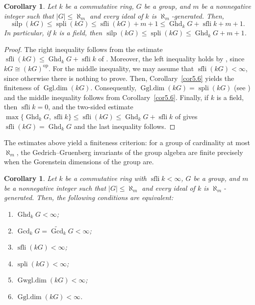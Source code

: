 \documentclass[12pt]{amsart}
\newtheorem{corollary}[theorem]{Corollary}
\theoremstyle{remark}
\theoremstyle{definition}
\theoremstyle{plain}
\DeclareMathOperator{\Ghd}{Ghd}
\DeclareMathOperator{\Gcd}{Gcd}
\DeclareMathOperator{\sfli}{sfli}
\DeclareMathOperator{\spli}{spli}
\DeclareMathOperator{\silp}{silp}
\DeclareMathOperator{\Gwgl}{Gwgl.dim}
\DeclareMathOperator{\Ggl}{Ggl.dim}
\newcommand{\PGFcd}{\widetilde{\Gcd}}
\newcommand{\alephm}{\aleph_m}
\begin{document}
\begin{corollary}\label{cor5.7}
Let $k$ be a commutative ring, $G$ be a group, and $m$ be a nonnegative integer such that $|G|\le\alephm$ and every ideal of $k$ is $\alephm$-generated. Then, \[\silp(kG)\le \spli(kG)\le\sfli(kG)+m+1\le\Ghd_kG+\sfli k+m+1 .\]
In particular, if $k$ is a field, then $\silp(kG)\le\spli(kG)\le\Ghd_kG+m+1$.
\end{corollary}

\begin{proof}
The right inequality follows from the estimate $\sfli(kG)\le\Ghd_kG+\sfli k$ of \cite[Corollary~6.2]{KS}. Moreover, the left inequality holds by \cite[Corollary~24]{DE}, since $kG\cong(kG)^{\mathrm{op}}$. For the middle inequality, we may assume that $\sfli(kG)<\infty$, since otherwise there is nothing to prove. Then, Corollary~\ref{cor5.6} yields the finiteness of $\Ggl(kG)$. Consequently, $\Ggl(kG)=\spli(kG)$ (see \cite[Theorem~4.1]{Emm}) and the middle inequality follows from Corollary~\ref{cor5.6}. Finally, if $k$ is a field, then $\sfli k=0$, and the two-sided estimate $\max\{\Ghd_kG,\sfli k\}\le\sfli(kG)\le\Ghd_kG+\sfli k$ of \cite[Corollary~6.2]{KS} gives $\sfli(kG)=\Ghd_kG$ and the last inequality follows.
\end{proof}

The estimates above yield a finiteness criterion: for a group of cardinality at most $\alephm$, the Gedrich--Gruenberg invariants of the group algebra are finite precisely when the Gorenstein dimensions of the group are.

\begin{corollary}\label{cor5.8} Let $k$ be a commutative ring with $\sfli k<\infty$, $G$ be a group, and $m$ be a nonnegative integer such that $|G|\le\alephm$ and every ideal of $k$ is $\alephm$-generated. Then, the following conditions are equivalent:
\begin{enumerate}
\item[(i)] $\Ghd_kG<\infty$;
\item[(ii)] $\Gcd_kG=\PGFcd_kG<\infty$;
\item[(iii)] $\sfli(kG)<\infty$;
\item[(iv)] $\spli(kG)<\infty$;
\item[(v)] $\Gwgl(kG)<\infty$;
\item[(vi)] $\Ggl(kG)<\infty$.
\end{enumerate}
\end{corollary}
\end{document}
